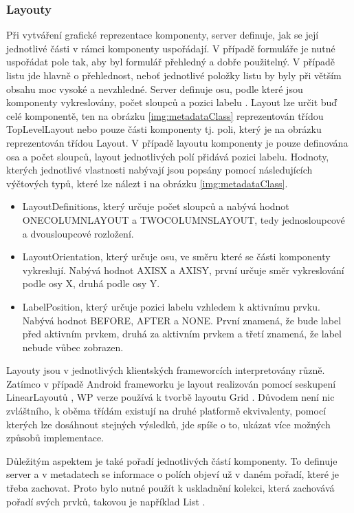 \subsubsection{Layouty}
Při vytváření grafické reprezentace komponenty, server definuje, jak se její jednotlivé části v rámci komponenty uspořádají. V případě formuláře je nutné uspořádat pole tak, aby byl formulář přehledný a dobře použitelný. V případě listu jde hlavně o přehlednost, neboť jednotlivé položky listu by byly při větším obsahu moc vysoké a nevzhledné. Server definuje osu, podle které jsou komponenty vykreslovány, počet sloupců a pozici labelu \cite{tomasek-thesis}. Layout lze určit buď celé komponentě, ten na obrázku \ref{img:metadataClass} reprezentován třídou TopLevelLayout nebo pouze části komponenty tj. poli, který je na obrázku reprezentován třídou Layout. V případě layoutu komponenty je pouze definována osa a počet sloupců, layout jednotlivých polí přidává pozici labelu. Hodnoty, kterých jednotlivé vlastnosti nabývají jsou popsány pomocí následujících výčtových typů, které lze nálezt i na obrázku \ref{img:metadataClass}.
\begin{itemize}
\item LayoutDefinitions, který určuje počet sloupců a nabývá hodnot ONECOLUMNLAYOUT a TWOCOLUMNSLAYOUT, tedy jednosloupcové a dvousloupcové rozložení.
\item LayoutOrientation, který určuje osu, ve směru které se části komponenty vykreslují. Nabývá hodnot AXISX a AXISY, první určuje směr vykreslování podle osy X, druhá podle osy Y.
\item LabelPosition, který určuje pozici labelu vzhledem k aktivnímu prvku. Nabývá hodnot BEFORE, AFTER a NONE. První znamená, že bude label před aktivním prvkem, druhá za aktivním prvkem a třetí znamená, že label nebude vůbec zobrazen.
\end{itemize}

Layouty jsou v jednotlivých klientských frameworcích interpretovány různě. Zatímco v případě Android frameworku je layout realizován pomocí seskupení LinearLayoutů \cite{android-lin-layout}, WP verze používá k tvorbě layoutu Grid \cite{wp-grid}. Důvodem není nic zvláštního, k oběma třídám existují na druhé platformě ekvivalenty, pomocí kterých lze dosáhnout stejných výsledků, jde spíše o to, ukázat více možných způsobů implementace. 

Důležitým aspektem je také pořadí jednotlivých částí komponenty. To definuje server a v metadatech se informace o polích objeví už v daném pořadí, které je třeba zachovat. Proto bylo nutné použít k uskladnění kolekci, která zachovává pořadí svých prvků, takovou je například List \cite{tomasek-thesis}.

